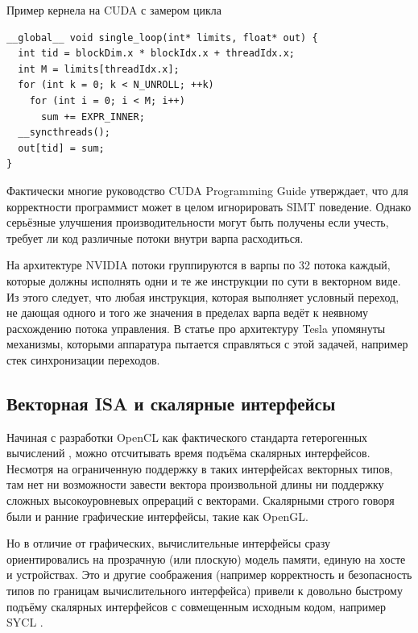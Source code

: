 \begin{ListingEnv}[!h]
    \captiondelim{ } 
    \caption{Пример кернела на CUDA с замером цикла}\label{lst:cudashader}
    \begin{lstlisting}[language={[ISO]C++}]
__global__ void single_loop(int* limits, float* out) {
  int tid = blockDim.x * blockIdx.x + threadIdx.x;
  int M = limits[threadIdx.x];
  for (int k = 0; k < N_UNROLL; ++k)
    for (int i = 0; i < M; i++)
      sum += EXPR_INNER;
  __syncthreads();
  out[tid] = sum;
}
    \end{lstlisting}
\end{ListingEnv}

Фактически многие руководство CUDA Programming Guide \cite{guide2013cuda} утверждает, что для корректности программист может в целом игнорировать SIMT поведение. Однако серьёзные улучшения производительности могут быть получены если учесть, требует ли код различные потоки внутри варпа расходиться.

На архитектуре NVIDIA потоки группируются в варпы по 32 потока каждый, которые должны исполнять одни и те же инструкции по сути в векторном виде. Из этого следует, что любая инструкция, которая выполняет условный переход, не дающая одного и того же значения в пределах варпа ведёт к неявному расхождению потока управления. В статье про архитектуру Tesla \cite{lindholm2008nvidia} упомянуты механизмы, которыми аппаратура пытается справляться с этой задачей, например стек синхронизации переходов.

\subsection{Векторная ISA и скалярные интерфейсы}\label{subsec:overview/vectorizing/sycl}

Начиная с разработки OpenCL как фактического стандарта гетерогенных вычислений \cite{munshi2011opencl}, можно отсчитывать время подъёма скалярных интерфейсов. Несмотря на ограниченную поддержку в таких интерфейсах векторных типов, там нет ни возможности завести вектора произвольной длины ни поддержку сложных высокоуровневых опрераций с векторами. Скалярными строго говоря были и ранние графические интерфейсы, такие как OpenGL.

Но в отличие от графических, вычислительные интерфейсы сразу ориентировались на прозрачную (или плоскую) модель памяти, единую на хосте и устройствах. Это и другие соображения (например корректность и безопасность типов по границам вычислительного интерфейса) привели к довольно быстрому подъёму скалярных интерфейсов с совмещенным исходным кодом, например SYCL \cite{reinders2021sycl}. 


